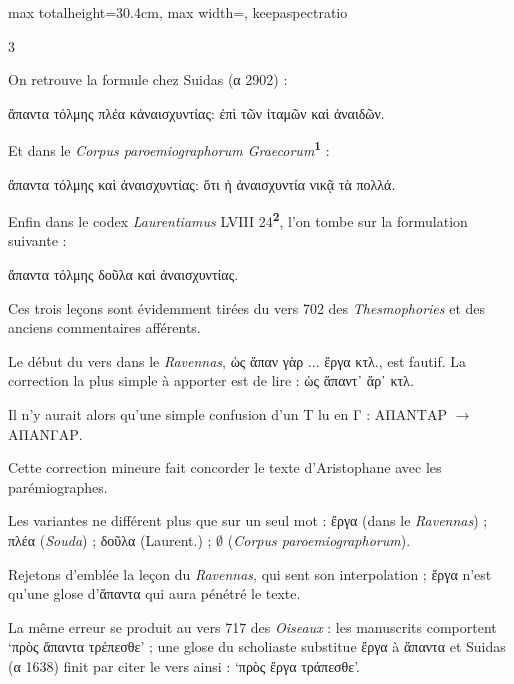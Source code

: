 \documentclass[11pt,twoside]{book}
\newcommand{\italique}[1]{\textit{#1}}
\newcommand{\citComm}[1]{\begin{quoting}[vskip=0.4pt,leftmargin=0.7em,rightmargin=0.2em]#1\end{quoting}}
\newcommand{\marqueur}[1]{\textsuperscript{\color{rubricRed}\textbf{#1}}}
\begin{document}
\begin{adjustbox}{max totalheight=30.4cm, max width=\textwidth, keepaspectratio}
\begin{minipage}{\textwidth}
{\begin{multicols}{3}
\par\vspace{1.5pt}
\noindent On retrouve la formule chez Suidas (α 2902) :
\citComm{ἅπαντα τόλμης πλέα κἀναισχυντίας: ἐπὶ τῶν ἰταμῶν καὶ ἀναιδῶν.}
\par\vspace{1.5pt}
\noindent Et dans le \italique{Corpus paroemiographorum Graecorum}\marqueur{1} :
\citComm{ἅπαντα τόλμης καὶ ἀναισχυντίας: ὅτι ἡ ἀναισχυντία νικᾷ τὰ πολλά.}
\par\vspace{1.5pt}
\noindent Enfin dans le codex \italique{Laurentiamus} LVIII 24\marqueur{2}, l'on tombe sur la formulation suivante :
\citComm{ἅπαντα τόλμης δοῦλα καὶ ἀναισχυντίας.}
\par\vspace{1.5pt}
\noindent Ces trois leçons sont évidemment tirées du vers 702 des \italique{Thesmophories} et des anciens commentaires afférents.
\par\vspace{1.5pt}
\noindent Le début du vers dans le \italique{Ravennas}, ὡς ἅπαν γὰρ ... ἔργα κτλ., est fautif. La correction la plus simple à apporter est de lire : ὡς ἅπαντ᾽ ἄρ᾽ κτλ.
\par\vspace{1.5pt}
\noindent Il n'y aurait alors qu'une simple confusion d'un Τ lu en Γ : ΑΠΑΝΤΑΡ $ \to $ ΑΠΑΝΓΑΡ.
\par\vspace{1.5pt}
\noindent Cette correction mineure fait concorder le texte d'Aristophane avec les parémiographes.
\par\vspace{1.5pt}
\noindent Les variantes ne différent plus que sur un seul mot : ἔργα (dans le \italique{Ravennas}) ; πλέα (\italique{Souda}) ; δοῦλα (Laurent.) ; $\emptyset$ (\italique{Corpus paroemiographorum}).
\par\vspace{1.5pt}
\noindent Rejetons d'emblée la leçon du \italique{Ravennas}, qui sent son interpolation ; ἔργα n'est qu'une glose d'ἅπαντα qui aura pénétré le texte.
\par\vspace{1.5pt}
\noindent La même erreur se produit au vers 717 des \italique{Oiseaux} : les manuscrits comportent `πρὸς ἅπαντα τρέπεσθε' ; une glose du scholiaste substitue ἔργα à ἅπαντα et Suidas (α 1638) finit par citer le vers ainsi : `πρὸς ἔργα τράπεσθε'.
\par\vspace{1.5pt}

\end{multicols}}
\end{minipage}
\end{adjustbox}
\end{document}
